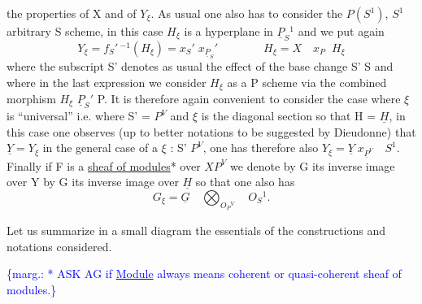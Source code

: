 \documentclass[11pt]{article}
\newcommand{\scanpage}[1]{\par\bigskip\noindent{\small\sffamily[scan #1]}\par}
\newcommand{\mspage}[1]{{\small\sffamily[p.\,#1]}}
\newcommand{\margin}[1]{\textcolor{blue}{\{\textsf{marg.:} #1\}}}
\newcommand{\uline}[1]{\underline{#1}}
\newenvironment{diagramblock}{\par\begin{center}}{\end{center}\par}
\begin{document}
the properties of X and of $Y_\xi$.  As usual one also has to consider
the $P(S^1)$, $S^1$ arbitrary S scheme, in this case $H_\xi$ is a hyperplane
in $\underline{P}_S{}^1$ and we put again
\[ Y_\xi = f_S{}'\,{}^{-1}(H_\xi) = x_S{}'\; x_{\underline{P}_{S}}{}' \qquad\qquad H_\xi = X \quad x_P \;\; H_\xi \]
where the subscript S' denotes as usual the effect of the base
change S' \qquad\qquad S and where in the last expression we consider
$H_\xi$ as a P scheme via the combined morphism $H_\xi$ \qquad $\underline{P}_S{}'$ \quad P.  It is
therefore again convenient to consider the case where $\xi$ is
``universal'' i.e. where S' = $P^V$ and $\xi$ is the diagonal section so
that H = $\underline{H}$, in this case one observes (up to better notations to
be suggested by Dieudonne) that $\underline{Y} = Y_\xi$ in the general case of a $\xi$
: S' \qquad\qquad $P^V$, one has therefore also $Y_\xi = \underline{Y}\; x_{\underline{P}^{V}} \quad S^1$.  Finally if
F is a \uline{sheaf of modules}* over $XP^V$ we denote by G its inverse image
over Y by G its inverse image over $\underline{H}$ so that one also has
\[ G_\xi = \underline{G} \quad \bigotimes_{O_{\underline{P}}{}^V} \quad O_S{}^1. \]

Let us summarize in a small diagram the essentials of the
constructions and notations considered.

\begin{diagramblock}
\end{diagramblock}

\margin{* ASK AG if \uline{Module} always means coherent or quasi-coherent sheaf of modules.}

\clearpage
\scanpage{24/8}
\mspage{8}
\end{document}
